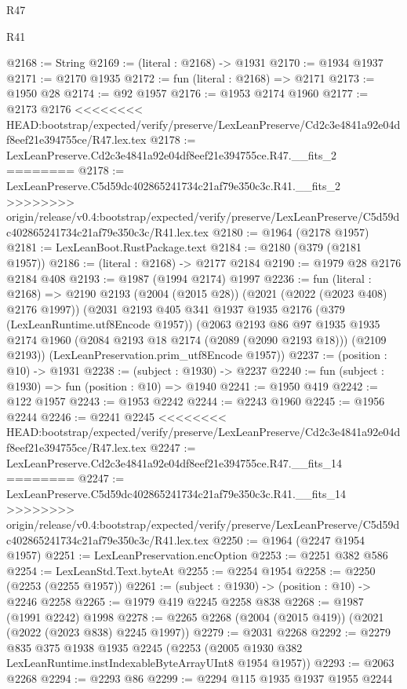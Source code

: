 \begin{lexlean}{R47}
\begin{lexlean}{R41}
\begin{coremodule}
{{{{{{{{{{{{{{{{{{{{{{{{{{{{{{{{{{{{{{{{{{{{{{{{{{{{{{{{{{{{{{{{{{{{{{{{{{{{{{{{{{{{{{{@2168 := String
@2169 := (literal : @2168) -> @1931
@2170 := @1934 @1937
@2171 := @2170 @1935
@2172 := fun (literal : @2168) => @2171
@2173 := @1950 @28
@2174 := @92 @1957
@2176 := @1953 @2174 @1960
@2177 := @2173 @2176
<<<<<<<< HEAD:bootstrap/expected/verify/preserve/LexLeanPreserve/Cd2c3e4841a92e04df8eef21e394755ce/R47.lex.tex
@2178 := LexLeanPreserve.Cd2c3e4841a92e04df8eef21e394755ce.R47.__fits_2
========
@2178 := LexLeanPreserve.C5d59dc402865241734c21af79e350c3c.R41.__fits_2
>>>>>>>> origin/release/v0.4:bootstrap/expected/verify/preserve/LexLeanPreserve/C5d59dc402865241734c21af79e350c3c/R41.lex.tex
@2180 := @1964 (@2178 @1957)
@2181 := LexLeanBoot.RustPackage.text
@2184 := @2180 (@379 (@2181 @1957))
@2186 := (literal : @2168) -> @2177 @2184
@2190 := @1979 @28 @2176 @2184 @408
@2193 := @1987 (@1994 @2174) @1997
@2236 := fun (literal : @2168) =>
  @2190
    @2193
    (@2004 (@2015 @28))
    (@2021 (@2022 (@2023 @408) @2176 @1997))
    (@2031
      @2193
      @405
      @341
      @1937
      @1935
      @2176
      (@379 (LexLeanRuntime.utf8Encode @1957))
      (@2063
        @2193
        @86
        @97
        @1935
        @1935
        @2174
        @1960
        (@2084 @2193 @18 @2174 (@2089 (@2090 @2193 @18)))
        (@2109 @2193))
      (LexLeanPreservation.prim_utf8Encode @1957))
@2237 := (position : @10) -> @1931
@2238 := (subject : @1930) -> @2237
@2240 := fun (subject : @1930) => fun (position : @10) => @1940
@2241 := @1950 @419
@2242 := @122 @1957
@2243 := @1953 @2242
@2244 := @2243 @1960
@2245 := @1956 @2244
@2246 := @2241 @2245
<<<<<<<< HEAD:bootstrap/expected/verify/preserve/LexLeanPreserve/Cd2c3e4841a92e04df8eef21e394755ce/R47.lex.tex
@2247 := LexLeanPreserve.Cd2c3e4841a92e04df8eef21e394755ce.R47.__fits_14
========
@2247 := LexLeanPreserve.C5d59dc402865241734c21af79e350c3c.R41.__fits_14
>>>>>>>> origin/release/v0.4:bootstrap/expected/verify/preserve/LexLeanPreserve/C5d59dc402865241734c21af79e350c3c/R41.lex.tex
@2250 := @1964 (@2247 @1954 @1957)
@2251 := LexLeanPreservation.encOption
@2253 := @2251 @382 @586
@2254 := LexLeanStd.Text.byteAt
@2255 := @2254 @1954
@2258 := @2250 (@2253 (@2255 @1957))
@2261 := (subject : @1930) -> (position : @10) -> @2246 @2258
@2265 := @1979 @419 @2245 @2258 @838
@2268 := @1987 (@1991 @2242) @1998
@2278 := @2265 @2268 (@2004 (@2015 @419)) (@2021 (@2022 (@2023 @838) @2245 @1997))
@2279 := @2031 @2268
@2292 := @2279
    @835
    @375
    @1938
    @1935
    @2245
    (@2253 (@2005 @1930 @382 LexLeanRuntime.instIndexableByteArrayUInt8 @1954 @1957))
@2293 := @2063 @2268
@2294 := @2293 @86
@2299 := @2294 @115 @1935 @1937 @1955 @2244
}}}}}}}}}}}}}}}}}}}}}}}}}}}}}}}}}}}}}}}}}}}}}}}}}}}}}}}}}}}}}}}}}}}}}}}}}}}}}}}}}}}}}}}
\end{coremodule}
\end{lexlean}
\end{lexlean}
